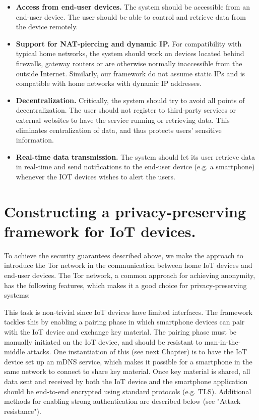 \begin{itemize}
	\item \textbf{Access from end-user devices.} The system should be accessible from an end-user device. The user should be able to control and retrieve data from the device remotely. 
	\item \textbf{Support for NAT-piercing and dynamic IP.}  For compatibility with typical home networks, the system should work on devices located behind firewalls, gateway routers or are otherwise normally inaccessible from the outside Internet. Similarly, our framework do not assume static IPs and is compatible with home networks with dynamic IP addresses.
	\item \textbf{Decentralization.} Critically, the system should try to avoid all points of decentralization. The user should not register to third-party services or external websites to have the service running or retrieving data. This eliminates centralization of data, and thus protects users' sensitive information.
	\item \textbf{Real-time data transmission.} The system should let its user retrieve data in real-time and send notifications to the end-user device (e.g. a smartphone) whenever the IOT devices wishes to alert the users.
\end{itemize}



\section{Constructing a privacy-preserving framework for IoT devices.}
To achieve the security guarantees described above, we make the approach to introduce the Tor network in the communication between home IoT devices and end-user devices. The Tor network, a common approach for achieving anonymity\cite{dingledine2004tor}, has the following features, which makes it a good choice for privacy-preserving systems:


 This task is non-trivial since IoT devices have limited interfaces. The framework tackles this by enabling a pairing phase in which smartphone devices can pair with the IoT device and exchange key material. The pairing phase must be manually initiated on the IoT device, and should be resistant to man-in-the-middle attacks. One instantiation of this (see next Chapter) is to have the IoT device set up an mDNS service, which makes it possible for a smartphone in the same network to connect to share key material. Once key material is shared, all data sent and received by both the IoT device and the smartphone application should be end-to-end encrypted using standard protocols (e.g. TLS). Additional methods for enabling strong authentication are described below (see "Attack resistance").


